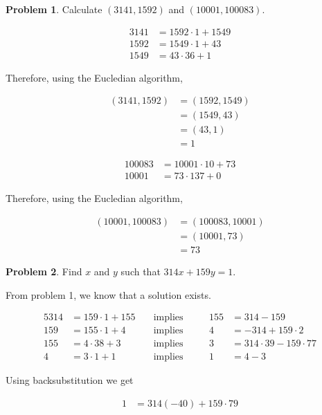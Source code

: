 \documentclass{article}
\theoremstyle{definition}
\newtheorem{problem}{Problem}
\begin{document}
  \begin{problem}
    Calculate $(3141, 1592)$ and $(10001, 100083)$.
  \end{problem}
  
  \begin{align*}
    3141 &= 1592 \cdot 1 + 1549 \\
    1592 &= 1549 \cdot 1 + 43 \\
    1549 &= 43 \cdot 36 + 1
  \end{align*}
  
  Therefore, using the Eucledian algorithm,
  
  \begin{align*}
    (3141, 1592) &= (1592, 1549) \\
    &= (1549, 43) \\
    &= (43, 1) \\
    &= 1
  \end{align*}
  
  \begin{align*}
    100083 &= 10001 \cdot 10 + 73 \\
    10001 &= 73 \cdot 137 + 0
  \end{align*}
  
  Therefore, using the Eucledian algorithm,
  
  \begin{align*}
    (10001, 100083) &= (100083, 10001) \\
    &= (10001, 73) \\
    &= 73
  \end{align*}
  
  \begin{problem}
    Find $x$ and $y$ such that $314x + 159y = 1$.
  \end{problem}
  
  From problem 1, we know that a solution exists.
  
  \begin{alignat*}{5}
    314 &= 159 \cdot 1 + 155 &\;&\text{implies} &\;&&155 &= 314 - 159 \\
    159 &= 155 \cdot 1 + 4 &\;&\text{implies} &\;&&4 &= -314 + 159 \cdot 2 \\
    155 &= 4 \cdot 38 + 3 &\;&\text{implies} &\;&& 3 &= 314 \cdot 39 - 159 \cdot 77 \\
    4 &= 3 \cdot 1 + 1 &\;&\text{implies} &\;&& 1 &= 4 - 3
  \end{alignat*}
  
  Using backsubstitution we get
  
  \begin{align*}
    1 &= 314 (-40) + 159 \cdot 79
  \end{align*}
  
\end{document}
